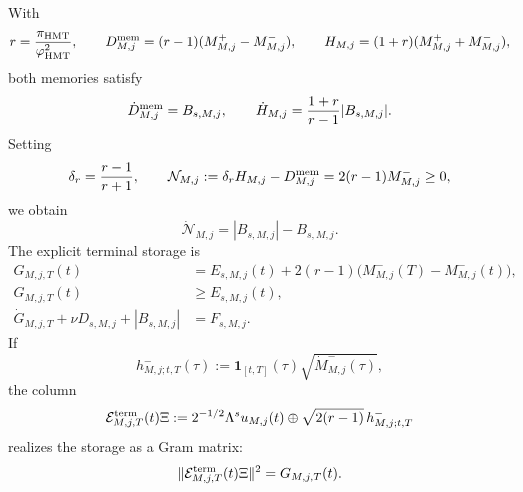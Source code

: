 With
\begin{equation}
 r=\frac{\pi_{\rm HMT}}{\varphi_{\rm HMT}^2},
 \qquad
 D_{M,j}^{\rm mem}=(r-1)(M_{M,j}^+-M_{M,j}^-),
 \qquad
 H_{M,j}=(1+r)(M_{M,j}^++M_{M,j}^-),
 \label{eq:ns-import-dh}
\end{equation}
both memories satisfy
\begin{equation}
 \dot D_{M,j}^{\rm mem}=B_{s,M,j},
 \qquad
 \dot H_{M,j}=\frac{1+r}{r-1}|B_{s,M,j}|.
 \label{eq:ns-import-dh-dot}
\end{equation}
Setting
\[
 \delta_r=\frac{r-1}{r+1},
 \qquad
 \mathcal N_{M,j}:=\delta_rH_{M,j}-D_{M,j}^{\rm mem}
 =2(r-1)M_{M,j}^-\ge0,
\]
we obtain
\begin{equation}
 \dot{\mathcal N}_{M,j}=|B_{s,M,j}|-B_{s,M,j}.
 \label{eq:ns-import-negative-memory}
\end{equation}
The explicit terminal storage is
\begin{equation}
 \begin{aligned}
 G_{M,j,T}(t)
 &=E_{s,M,j}(t)
   +2(r-1)\bigl(M_{M,j}^-(T)-M_{M,j}^-(t)\bigr),\\
 G_{M,j,T}(t)&\ge E_{s,M,j}(t),\\
 \dot G_{M,j,T}+\nu D_{s,M,j}+|B_{s,M,j}|
 &=F_{s,M,j}.
 \end{aligned}
 \label{eq:ns-import-terminal-storage}
\end{equation}
If
\[
 h^-_{M,j;t,T}(\tau)
 :=\mathbf1_{[t,T]}(\tau)\sqrt{\dot M^-_{M,j}(\tau)},
\]
the column
\begin{equation}
 \mathcal E_{M,j,T}^{\rm term}(t)\Xi
 :=2^{-1/2}\Lambda^su_{M,j}(t)
 \oplus\sqrt{2(r-1)}\,h^-_{M,j;t,T}
 \label{eq:ns-import-terminal-column}
\end{equation}
realizes the storage as a Gram matrix:
\begin{equation}
 \|\mathcal E_{M,j,T}^{\rm term}(t)\Xi\|^2
 =G_{M,j,T}(t).
 \label{eq:ns-import-terminal-gram}
\end{equation}

